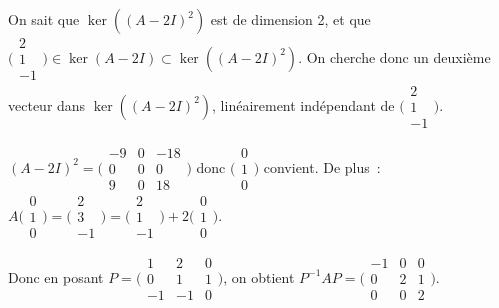 {{On sait que $\ker((A-2I)^{2})$ est de dimension 2, et que $\Big(\begin{smallmatrix}%
    2\\1\\-1%
  \end{smallmatrix}\Big)\in\ker(A-2I)\subset\ker((A-2I)^{2})$.
 On cherche donc un deuxième vecteur dans $\ker((A-2I)^{2})$, linéairement
 indépendant de $\Big(\begin{smallmatrix}%
    2\\1\\-1%
  \end{smallmatrix}\Big)$.

$(A-2I)^{2}=\Big(\begin{smallmatrix}%
    -9&0&-18\\0&0&0\\9&0&18%
  \end{smallmatrix}\Big)$
donc $\Big(\begin{smallmatrix}%
    0\\1\\0%
  \end{smallmatrix}\Big)$
convient. De plus~: $A\Big(\begin{smallmatrix}%
    0\\1\\0%
  \end{smallmatrix}\Big)=\Big(\begin{smallmatrix}%
    2\\3\\-1%
  \end{smallmatrix}\Big)=\Big(\begin{smallmatrix}%
    2\\1\\-1%
  \end{smallmatrix}\Big)+2\Big(\begin{smallmatrix}%
    0\\1\\0%
  \end{smallmatrix}\Big)$.

Donc en posant $P=\Big(\begin{smallmatrix}%
    1&2&0\\0&1&1\\-1&-1&0%
  \end{smallmatrix}\Big)$, on obtient
$P^{-1}AP=\Big(\begin{smallmatrix}%
    -1&0&0\\0&2&1\\0&0&2%
  \end{smallmatrix}\Big)$.}
}